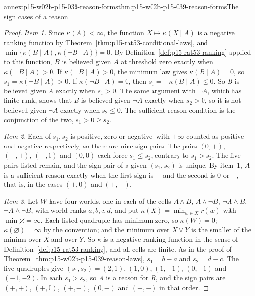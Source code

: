 \begin{annexitem}{annex:p15-w02b-p15-039-reason-forms}{thm:p15-w02b-p15-039-reason-forms}{The sign cases of a reason}
\begin{proof}
\emph{Item 1.}  Since \(\kappa(A)<\infty\), the function
\(X\mapsto\kappa(X\mid A)\) is a negative ranking function by
Theorem~\ref{thm:p15-rat53-conditional-laws}, and
\(\min\{\kappa(B\mid A),\kappa(\neg B\mid A)\}=0\).  By
Definition~\ref{def:p15-rat53-ranking} applied to this function, \(B\) is
believed given \(A\) at threshold zero exactly when \(\kappa(\neg B\mid A)>0\).
If \(\kappa(\neg B\mid A)>0\), the minimum law gives \(\kappa(B\mid A)=0\),
so \(s_1=\kappa(\neg B\mid A)>0\).  If \(\kappa(\neg B\mid A)=0\), then
\(s_1=-\kappa(B\mid A)\leq0\).  So \(B\) is believed given \(A\) exactly
when \(s_1>0\).  The same argument with \(\neg A\), which has finite rank,
shows that \(B\) is believed given \(\neg A\) exactly when \(s_2>0\), so it
is not believed given \(\neg A\) exactly when \(s_2\leq0\).  The sufficient
reason condition is the conjunction of the two, \(s_1>0\geq s_2\).

\emph{Item 2.}  Each of \(s_1,s_2\) is positive, zero or negative, with
\(\pm\infty\) counted as positive and negative respectively, so there are
nine sign pairs.  The pairs \((0,+)\), \((-,+)\), \((-,0)\) and \((0,0)\)
each force \(s_1\leq s_2\), contrary to \(s_1>s_2\).  The five pairs listed
remain, and the sign pair of a given \((s_1,s_2)\) is unique.  By item~1,
\(A\) is a sufficient reason exactly when the first sign is \(+\) and the
second is \(0\) or \(-\), that is, in the cases \((+,0)\) and \((+,-)\).

\emph{Item 3.}  Let \(W\) have four worlds, one in each of the cells
\(A\land B\), \(A\land\neg B\), \(\neg A\land B\), \(\neg A\land\neg B\),
with world ranks \(a,b,c,d\), and put \(\kappa(X)=\min_{w\in X}r(w)\) with
\(\min\varnothing=\infty\).  Each listed quadruple has minimum zero, so
\(\kappa(W)=0\); \(\kappa(\varnothing)=\infty\) by the convention; and the
minimum over \(X\lor Y\) is the smaller of the minima over \(X\) and over
\(Y\).  So \(\kappa\) is a negative ranking function in the sense of
Definition~\ref{def:p15-rat53-ranking}, and all cells are finite.  As in the proof of
Theorem~\ref{thm:p15-w02b-p15-039-reason-laws}, \(s_1=b-a\) and
\(s_2=d-c\).  The five quadruples give \((s_1,s_2)=(2,1)\), \((1,0)\),
\((1,-1)\), \((0,-1)\) and \((-1,-2)\).  In each \(s_1>s_2\), so \(A\) is a
reason for \(B\), and the sign pairs are \((+,+)\), \((+,0)\), \((+,-)\),
\((0,-)\) and \((-,-)\) in that order.


\end{proof}
\end{annexitem}
